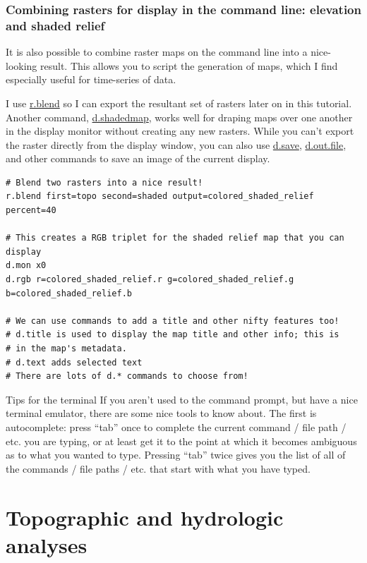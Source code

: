 \documentclass{book}
\begin{document}
\subsection{Combining rasters for display in the command line: elevation and shaded relief \label{s:drastCLI}}

It is also possible to combine raster maps on the command line into a nice-looking result. This allows you to script the generation of maps, which I find especially useful for time-series of data.

I use \url{r.blend} so I can export the resultant set of rasters later on in this tutorial. Another command, \url{d.shadedmap}, works well for draping maps over one another in the display monitor without creating any new rasters. While you can't export the raster directly from the display window, you can also use \url{d.save}, \url{d.out.file}, and other commands to save an image of the current display.

\begin{lstlisting}
# Blend two rasters into a nice result!
r.blend first=topo second=shaded output=colored_shaded_relief percent=40

# This creates a RGB triplet for the shaded relief map that you can display
d.mon x0
d.rgb r=colored_shaded_relief.r g=colored_shaded_relief.g b=colored_shaded_relief.b

# We can use commands to add a title and other nifty features too!
# d.title is used to display the map title and other info; this is 
# in the map's metadata.
# d.text adds selected text
# There are lots of d.* commands to choose from!
\end{lstlisting}

\begin{boxx}[!ht]
\begin{bclogo}[arrondi = 0.1, logo = \bcrosevents]{Tips for the terminal}
If you aren't used to the command prompt, but have a nice terminal emulator, there are some nice tools to know about. The first is autocomplete: press ``tab'' once to complete the current command / file path / etc. you are typing, or at least get it to the point at which it becomes ambiguous as to what you wanted to type. Pressing ``tab'' twice gives you the list of all of the commands / file paths / etc. that start with what you have typed.
\end{bclogo}
\caption{Tips for the terminal}
\end{boxx}


\chapter{Topographic and hydrologic analyses}
\end{document}
